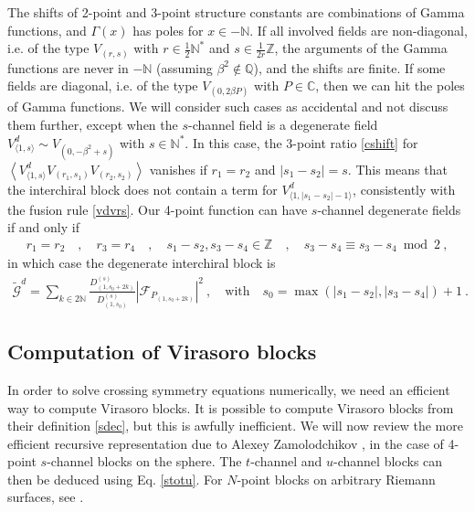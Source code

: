 \documentclass[12pt, a4paper]{article}
\theoremstyle{break}
\begin{document}
The shifts of 2-point and 3-point structure constants are combinations of Gamma functions, and $\Gamma(x)$ has poles for $x\in -\mathbb{N}$.
If all involved fields are non-diagonal, i.e. of the type $V_{(r,s)}$ with $r\in\frac12\mathbb{N}^*$ and $s\in\frac{1}{2r}\mathbb{Z}$, the arguments of the Gamma functions are never in $-\mathbb{N}$ (assuming $\beta^2\notin \mathbb{Q}$), and the shifts are finite. If some fields are diagonal, i.e. of the type $V_{(0,2\beta P)}$ with $P\in \mathbb{C}$, then we can hit the poles of Gamma functions. We will consider such cases as accidental and not discuss them further, except when the $s$-channel field is a degenerate field $V^d_{\langle 1,s\rangle}\sim V_{(0,-\beta^2+s)}$ with $s\in\mathbb{N}^*$. 
In this case, the 3-point ratio \eqref{cshift} for $\left<V^d_{\langle 1,s\rangle}V_{(r_1,s_1)}V_{(r_2,s_2)}\right>$ vanishes if $r_1=r_2$ and $|s_1-s_2|=s$. This means that the interchiral block does not contain a term for $V^d_{\langle 1,|s_1-s_2|-1\rangle}$, consistently with the fusion rule \eqref{vdvrs}. Our 4-point function can have $s$-channel degenerate fields if and only if 
\begin{align}
 r_1=r_2 \quad , \quad r_3=r_4 \quad , \quad s_1-s_2,s_3-s_4\in \mathbb{Z} \quad , \quad s_3-s_4\equiv s_3-s_4\bmod 2\ , 
\end{align}
in which case the degenerate interchiral block is 
\begin{align}
 \boxed{\widetilde{\mathcal{G}}^d = \sum_{k\in 2\mathbb{N}} \frac{D^{(s)}_{(1,s_0+2k)}}{D^{(s)}_{(1,s_0)}}\left| \mathcal{F}_{P_{(1,s_0+2k)}} \right|^2\ ,  \quad \text{with} \quad s_0 =  \max(|s_1-s_2|,|s_3-s_4|)+1}\ . 
\end{align}

\subsection{Computation of Virasoro blocks}

In order to solve crossing symmetry equations numerically, we need an efficient way to compute Virasoro blocks. It is possible to compute Virasoro blocks from their definition \eqref{sdec}, but this is awfully inefficient. We will now review the more efficient recursive representation due to Alexey Zamolodchikov \cite{zam87b}, in the case of 4-point $s$-channel blocks on the sphere. The $t$-channel and $u$-channel blocks can then be deduced using Eq. \eqref{stotu}. For $N$-point blocks on arbitrary Riemann surfaces, see \cite{ccy17}.
\end{document}

